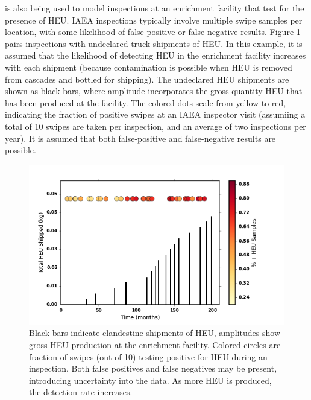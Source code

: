 \Cyclus is also being used to model inspections at an enrichment facility that test for the presence of \gls{HEU}. IAEA inspections typically involve multiple swipe samples per location, with some likelihood of false-positive or false-negative results\cite{ryjinski_idms_2003}.  Figure \ref{fig:inspect} pairs inspections with undeclared truck shipments of \gls{HEU}. In this example, it is assumed that the likelihood of detecting \gls{HEU} in the enrichment facility increases with each shipment (because contamination is possible when \gls{HEU} is removed from cascades and bottled for shipping).  The undeclared \gls{HEU} shipments are shown as black bars, where amplitude incorporates the gross quantity \gls{HEU} that has been produced at the facility. The colored dots scale from yellow to red, indicating the fraction of positive swipes at an \gls{IAEA} inspector visit (assumiing a total of 10 swipes are taken per inspection, and an average of two inspections per year).  It is assumed that both false-positive and false-negative results are possible. 

\begin{figure}%
\begin{center}
\includegraphics[natwidth=162bp,natheight=227bp, scale=0.6]{./figs/mm_5enrich_tinytails_inspinspect_ship.png}
\end{center}
\caption{Black bars indicate clandestine shipments of \gls{HEU}, amplitudes show gross \gls{HEU} production at the enrichment facility.  Colored circles are fraction of swipes (out of 10) testing positive for \gls{HEU} during an inspection. Both false positives and false negatives may be present, introducing uncertainty into the data. As more \gls{HEU} is produced, the detection rate increases.}
\label{fig:inspect}
\end{figure}

